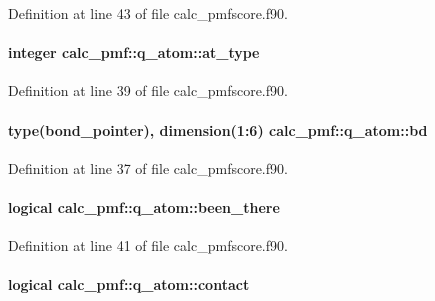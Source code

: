 Definition at line 43 of file calc\-\_\-pmfscore.\-f90.

\hypertarget{structcalc__pmf_1_1q__atom_ae214b397a75cb1ddbbc609afe6ccfb6f}{
\paragraph[{at\-\_\-type}]{\setlength{\rightskip}{0pt plus 5cm}integer calc\-\_\-pmf\-::q\-\_\-atom\-::at\-\_\-type}}\label{structcalc__pmf_1_1q__atom_ae214b397a75cb1ddbbc609afe6ccfb6f}


Definition at line 39 of file calc\-\_\-pmfscore.\-f90.

\hypertarget{structcalc__pmf_1_1q__atom_a1339270eeede3b493cde60ac5b70abbe}{
\paragraph[{bd}]{\setlength{\rightskip}{0pt plus 5cm}type({\bf bond\-\_\-pointer}), dimension(1\-:6) calc\-\_\-pmf\-::q\-\_\-atom\-::bd}}\label{structcalc__pmf_1_1q__atom_a1339270eeede3b493cde60ac5b70abbe}


Definition at line 37 of file calc\-\_\-pmfscore.\-f90.

\hypertarget{structcalc__pmf_1_1q__atom_a622d06b0bb3182cb78b0626be1c256d9}{
\paragraph[{been\-\_\-there}]{\setlength{\rightskip}{0pt plus 5cm}logical calc\-\_\-pmf\-::q\-\_\-atom\-::been\-\_\-there}}\label{structcalc__pmf_1_1q__atom_a622d06b0bb3182cb78b0626be1c256d9}


Definition at line 41 of file calc\-\_\-pmfscore.\-f90.

\hypertarget{structcalc__pmf_1_1q__atom_a65c37473a2d186c40e51de7b1e59576f}{
\paragraph[{contact}]{\setlength{\rightskip}{0pt plus 5cm}logical calc\-\_\-pmf\-::q\-\_\-atom\-::contact}}\label{structcalc__pmf_1_1q__atom_a65c37473a2d186c40e51de7b1e59576f}



